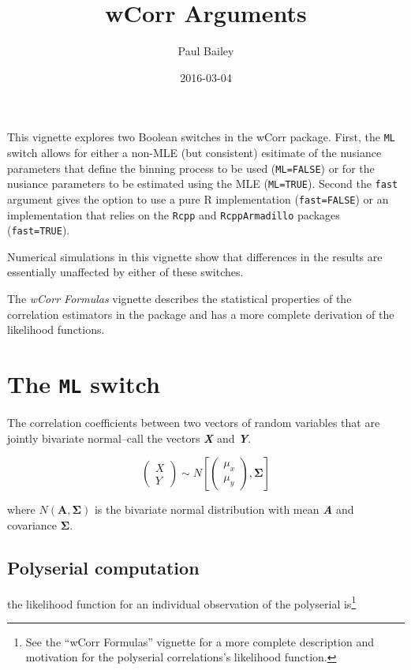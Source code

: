 \documentclass[]{article}
\title{wCorr Arguments}
\author{Paul Bailey}
\date{2016-03-04}
\let\rmarkdownfootnote\footnote%
\def\footnote{\protect\rmarkdownfootnote}
\begin{document}
\maketitle

This vignette explores two Boolean switches in the wCorr package. First,
the \texttt{ML} switch allows for either a non-MLE (but consistent)
esitimate of the nusiance parameters that define the binning process to
be used (\texttt{ML=FALSE}) or for the nusiance parameters to be
estimated using the MLE (\texttt{ML=TRUE}). Second the \texttt{fast}
argument gives the option to use a pure R implementation
(\texttt{fast=FALSE}) or an implementation that relies on the
\texttt{Rcpp} and \texttt{RcppArmadillo} packages (\texttt{fast=TRUE}).

Numerical simulations in this vignette show that differences in the
results are essentially unaffected by either of these switches.

The \emph{wCorr Formulas} vignette describes the statistical properties
of the correlation estimators in the package and has a more complete
derivation of the likelihood functions.

\section{\texorpdfstring{The \texttt{ML}
switch}{The ML switch}}\label{the-ml-switch}

The correlation coefficients between two vectors of random variables
that are jointly bivariate normal--call the vectors \textbf{\emph{X}}
and \textbf{\emph{Y}}.

\[\begin{pmatrix} X \\ Y \end{pmatrix} \sim N \left[ \begin{pmatrix} \mu_x \\ \mu_y \end{pmatrix}, \boldsymbol{\Sigma} \right] \]

where \(N(\mathbf{A},\boldsymbol{\Sigma})\) is the bivariate normal
distribution with mean \textbf{\emph{A}} and covariance
\(\boldsymbol{\Sigma}\).

\subsection{Polyserial computation}\label{polyserial-computation}

the likelihood function for an individual observation of the polyserial
is\footnote{See the ``wCorr Formulas'' vignette for a more complete
  description and motivation for the polyserial correlations's
  likelihood function.}
\end{document}
